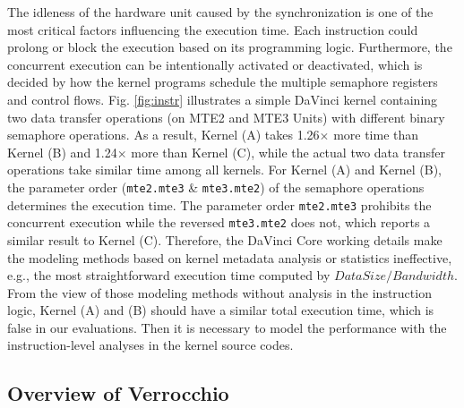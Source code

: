 \documentclass[12pt]{extbook}
\begin{document}
The idleness of the hardware unit caused by the synchronization is one of the most critical factors influencing the execution time. Each instruction could prolong or block the execution based on its programming logic. Furthermore, the concurrent execution can be intentionally activated or deactivated, which is decided by how the kernel programs schedule the multiple semaphore registers and control flows. Fig. \ref{fig:instr} illustrates a simple DaVinci kernel containing two data transfer operations (on MTE2 and MTE3 Units) with different binary semaphore operations. As a result, Kernel (A) takes 1.26$\times$ more time than Kernel (B) and 1.24$\times$ more than Kernel (C), while the actual two data transfer operations take similar time among all kernels. 
For Kernel (A) and Kernel (B), the parameter order (\verb|mte2.mte3| \& \verb|mte3.mte2|) of the semaphore operations determines the execution time. The parameter order \verb|mte2.mte3| prohibits the concurrent execution while the reversed \verb|mte3.mte2| does not, which reports a similar result to Kernel (C).
Therefore, the DaVinci Core working details make the modeling methods based on kernel metadata analysis or statistics ineffective, e.g., the most straightforward execution time computed by $DataSize / Bandwidth$. From the view of those modeling methods without analysis in the instruction logic, Kernel (A) and (B) should have a similar total execution time, which is false in our evaluations. Then it is necessary to model the performance with the instruction-level analyses in the kernel source codes.

\subsection{Overview of Verrocchio}

\begin{figure}[htbp]
\end{figure}
\end{document}
